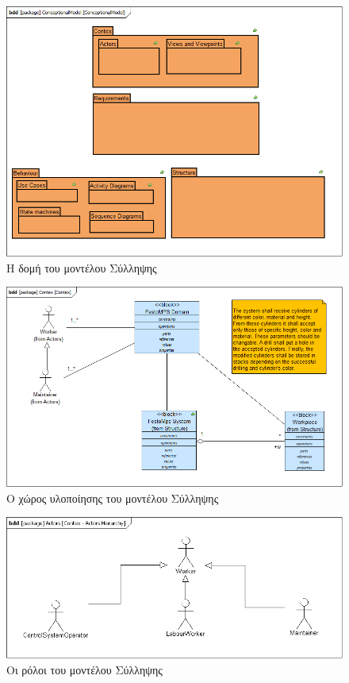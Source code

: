 \documentclass[a4paper,12pt,twoside]{report}
\begin{document}
\begin{appendices}
				\clearpage
				\begin{figure}[hp]
					\centering
					\includegraphics[scale=0.45]{ConceptionalModel_ConceptionalModel.png}
					\caption{Η δομή του μοντέλου Σύλληψης}
					\label{φωτ:Η δομή του μοντέλου Σύλληψης}
				\end{figure}
				
				\begin{figure}[hp]
					\centering
					\includegraphics[scale=0.45]{ConceptionalModel_Contex.png}
					\caption{Ο χώρος υλοποίησης του μοντέλου Σύλληψης}
					\label{φωτ:Ο χώρος υλοποίησης του μοντέλου Σύλληψης}
				\end{figure}
				
				\begin{figure}[hp]
					\centering
					\includegraphics[scale=0.30]{ConceptionalModel_Contex-ActorsHierarchy.png}
					\caption{Οι ρόλοι του μοντέλου Σύλληψης}
					\label{φωτ:Οι ρόλοι του μοντέλου Σύλληψης}
				\end{figure}


\end{appendices}
\end{document}
